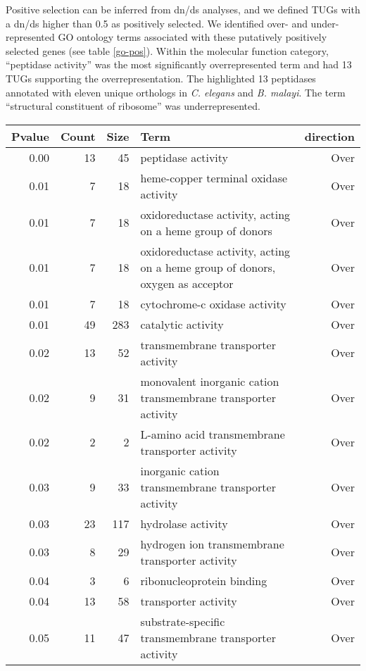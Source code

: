 Positive selection can be inferred from dn/ds analyses, and we defined
TUGs with a dn/ds higher than 0.5 as positively selected. We
identified over- and under-represented GO ontology terms associated
with these putatively positively selected genes (see table
\ref{go-pos}). Within the molecular function category, ``peptidase
activity'' was the most significantly overrepresented term and had 13
TUGs supporting the overrepresentation. The highlighted 13 peptidases
annotated with eleven unique orthologs in \textit{C. elegans} and
\textit{B. malayi}.  The term ``structural constituent of ribosome''
was underrepresented.

\begin{longtable}{rrrp{7cm}r}
 Pvalue & Count & Size & Term & direction \\ 
  \hline
0.00 &  13 &  45 & peptidase activity & Over \\ 
  0.01 &   7 &  18 & heme-copper terminal oxidase activity & Over \\ 
  0.01 &   7 &  18 & oxidoreductase activity, acting on a heme group of donors & Over \\ 
  0.01 &   7 &  18 & oxidoreductase activity, acting on a heme group of donors, oxygen as acceptor & Over \\ 
  0.01 &   7 &  18 & cytochrome-c oxidase activity & Over \\ 
  0.01 &  49 & 283 & catalytic activity & Over \\ 
  0.02 &  13 &  52 & transmembrane transporter activity & Over \\ 
  0.02 &   9 &  31 & monovalent inorganic cation transmembrane transporter activity & Over \\ 
  0.02 &   2 &   2 & L-amino acid transmembrane transporter activity & Over \\ 
  0.03 &   9 &  33 & inorganic cation transmembrane transporter activity & Over \\ 
  0.03 &  23 & 117 & hydrolase activity & Over \\ 
  0.03 &   8 &  29 & hydrogen ion transmembrane transporter activity & Over \\ 
  0.04 &   3 &   6 & ribonucleoprotein binding & Over \\ 
  0.04 &  13 &  58 & transporter activity & Over \\ 
  0.05 &  11 &  47 & substrate-specific transmembrane transporter activity & Over \\ 

\end{longtable}
